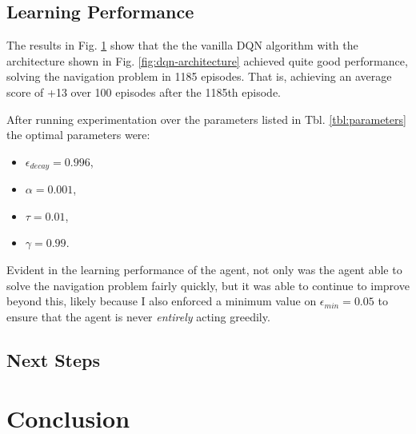 \documentclass[11pt]{article}
\begin{document}
\subsection{Learning Performance}

The results in Fig. \ref{fig:dqn-results} show that the the vanilla DQN
algorithm with the architecture shown in Fig. \ref{fig:dqn-architecture} achieved 
quite good performance, solving the navigation problem in 1185 episodes. That is, 
achieving an average score of +13 over 100 episodes after the 1185th episode.

\FloatBarrier

\begin{figure}[!ht]
	\centering
	\caption{}
	\label{fig:dqn-results}
\end{figure}

\FloatBarrier

After running experimentation over the parameters listed in Tbl. \ref{tbl:parameters} 
the optimal parameters were:
\begin{itemize}
	\item $\epsilon_{decay} = 0.996$,
	\item $\alpha = 0.001$,
	\item $\tau = 0.01$,
	\item $\gamma = 0.99$.
\end{itemize}

Evident in the learning performance of the agent, not only was the agent able to 
solve the navigation problem fairly quickly, but it was able to continue to improve 
beyond this, likely because I also enforced a minimum value on $\epsilon_{min} = 0.05$ 
to ensure that the agent is never \textit{entirely} acting greedily.

\subsection{Next Steps}



\section{Conclusion}






\end{document}
